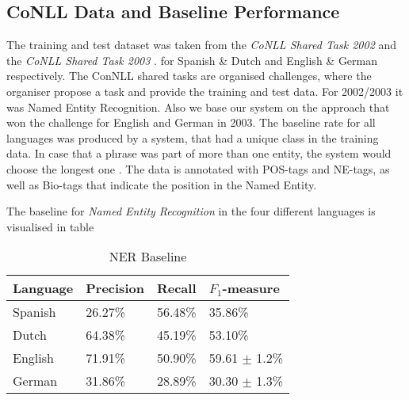 \documentclass[11pt]{article}
\begin{document}
\subsection*{CoNLL Data and Baseline Performance}
The training and test dataset was taken from the \emph{CoNLL Shared Task 2002} \cite{tksintro2002conll} and the \emph{CoNLL Shared Task 2003} \cite{TjongKimSang:2003:ICS:1119176.1119195}.
for Spanish \& Dutch and English \& German respectively. The ConNLL shared tasks are organised challenges, where the organiser propose a task and provide the
training and test data. For 2002/2003 it was Named Entity Recognition. Also we base our system on the approach that won the challenge for English and German in 2003. 
The baseline rate for all languages was produced by a system, that had a unique class in the training data. In case that a phrase was part of more than one entity, 
the system would choose the longest one \cite{TjongKimSang:2003:ICS:1119176.1119195}. 
The data is annotated with POS-tags and NE-tags, as well as Bio-tags that indicate the position in the Named Entity. 

The baseline for \emph{Named Entity Recognition} in the four different languages is visualised in table \
\begin{table}[h!]
\scriptsize
\begin{tabular}{|l|l|l|l|}
\hline
\bf Language & \bf Precision & \bf Recall & \bf $F_1$-measure \\ \hline
Spanish &             26.27\% & 56.48\% & 35.86\%        \\
Dutch  &             64.38\%  &45.19\%    & 53.10\%  \\
English &              71.91\%& 50.90\%  & 59.61 $\pm$ 1.2\%\\
German &      31.86\%  & 28.89\% & 30.30  $\pm$ 1.3\% \\
\hline
\end{tabular}
\caption{NER Baseline}
\label{table:Base}
\end{table}
\end{document}
